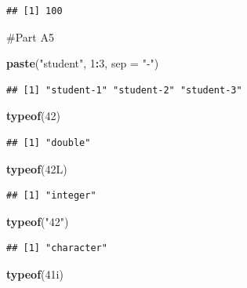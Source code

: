 \documentclass[
]{article}
\newenvironment{Shaded}{\begin{snugshade}}{\end{snugshade}}
\newcommand{\AttributeTok}[1]{\textcolor[rgb]{0.13,0.29,0.53}{#1}}
\newcommand{\DataTypeTok}[1]{\textcolor[rgb]{0.13,0.29,0.53}{#1}}
\newcommand{\DecValTok}[1]{\textcolor[rgb]{0.00,0.00,0.81}{#1}}
\newcommand{\FunctionTok}[1]{\textcolor[rgb]{0.13,0.29,0.53}{\textbf{#1}}}
\newcommand{\NormalTok}[1]{#1}
\newcommand{\SpecialCharTok}[1]{\textcolor[rgb]{0.81,0.36,0.00}{\textbf{#1}}}
\newcommand{\StringTok}[1]{\textcolor[rgb]{0.31,0.60,0.02}{#1}}
\begin{document}
\begin{verbatim}
## [1] 100
\end{verbatim}

\#Part A5

\begin{Shaded}
\begin{Highlighting}[]
\FunctionTok{paste}\NormalTok{(}\StringTok{"student"}\NormalTok{, }\DecValTok{1}\SpecialCharTok{:}\DecValTok{3}\NormalTok{, }\AttributeTok{sep =} \StringTok{"{-}"}\NormalTok{)}
\end{Highlighting}
\end{Shaded}

\begin{verbatim}
## [1] "student-1" "student-2" "student-3"
\end{verbatim}

\begin{Shaded}
\begin{Highlighting}[]
\FunctionTok{typeof}\NormalTok{(}\DecValTok{42}\NormalTok{)}
\end{Highlighting}
\end{Shaded}

\begin{verbatim}
## [1] "double"
\end{verbatim}

\begin{Shaded}
\begin{Highlighting}[]
\FunctionTok{typeof}\NormalTok{(}\DecValTok{42}\DataTypeTok{L}\NormalTok{)}
\end{Highlighting}
\end{Shaded}

\begin{verbatim}
## [1] "integer"
\end{verbatim}

\begin{Shaded}
\begin{Highlighting}[]
\FunctionTok{typeof}\NormalTok{(}\StringTok{"42"}\NormalTok{)}
\end{Highlighting}
\end{Shaded}

\begin{verbatim}
## [1] "character"
\end{verbatim}

\begin{Shaded}
\begin{Highlighting}[]
\FunctionTok{typeof}\NormalTok{(}\DecValTok{41}\DataTypeTok{i}\NormalTok{)}
\end{Highlighting}
\end{Shaded}
\end{document}
